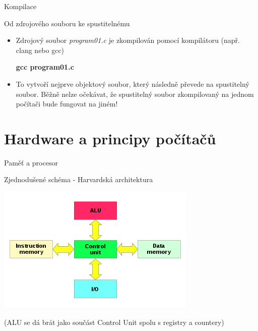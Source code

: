 \documentclass[9pt]{beamer}
\begin{document}
\begin{frame}{Kompilace}
    \begin{block}{Od zdrojového souboru ke spustitelnému}
        \begin{itemize}
            \item Zdrojový soubor \textit{program01.c} je zkompilován pomocí kompilátoru (např. clang nebo gcc) \\
            \begin{center}
                \textbf{gcc program01.c}
            \end{center}
            \item To vytvoří nejprve objektový soubor, který následně převede na spustitelný soubor. Běžně nelze očekávat, že spustitelný soubor zkompilovaný na jednom počítači bude fungovat na jiném!
        \end{itemize}
    \end{block}
\end{frame}

\section{Hardware a principy počítačů}

\begin{frame}{Paměť a procesor}
    \begin{block}{Zjednodušené schéma - Harvardská architektura}
        \begin{center}
            \includegraphics[width=0.8\linewidth]{lekce19/harvard-architecture.png}
        \end{center}
        (ALU se dá brát jako součást Control Unit spolu s registry a countery)
    \end{block}
\end{frame}
\end{document}
